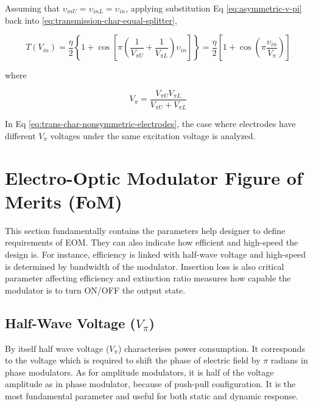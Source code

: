 \documentclass[thesis]{deutez}
\begin{document}
    Assuming that $\upsilon_{inU}=\upsilon_{inL}=\upsilon_{in}$, applying substitution Eq \ref{eq:asymmetric-v-pi} back into \ref{eq:transmission-char-equal-splitter},  

    \begin{equation}
        T(V_{in}) = \frac{\eta}{2} \left\{ 1+\cos \left[\pi \left( \frac{1}{V_{\pi U}}+\frac{1}{V_{\pi L}} \right) \upsilon_{in} \right] \right\} = \frac{\eta}{2} \left[ 1+\cos(\pi \frac{\upsilon_{in}}{V_\pi}) \right] 
        \label{eq:trans-char-nonsymmetric-electrodes} 
    \end{equation}

    where 

    \begin{equation}
        V_\pi = \frac{V_{\pi U}V_{\pi L}}{V_{\pi U}+V_{\pi L}}
    \end{equation}
    
    In Eq \ref{eq:trans-char-nonsymmetric-electrodes}, the case where electrodes have different $V_{\pi}$ voltages under the same excitation voltage is analyzed.


    

    \section{Electro-Optic Modulator Figure of Merits (FoM)}
    \label{sec:el-op-fom}
    This section fundamentally contains the parameters help designer to define requirements of EOM. They can also indicate how efficient and high-speed the design is. For instance, efficiency is linked with half-wave voltage and high-speed is determined by bandwidth of the modulator. Insertion loss is also critical parameter affecting efficiency and extinction ratio measures how capable the modulator is to turn ON/OFF the output state.
    
    \subsection{Half-Wave Voltage ($V_\pi$)}
    By itself half wave voltage ($V_\pi$) characterises power consumption.  It corresponds to the voltage which is required to shift the phase of electric field by $\pi$ radians in phase modulators. As for amplitude modulators, it is half of the voltage amplitude as in phase modulator, because of push-pull configuration. It is the most fundamental parameter and useful for both static and dynamic response. 
    
\end{document}
